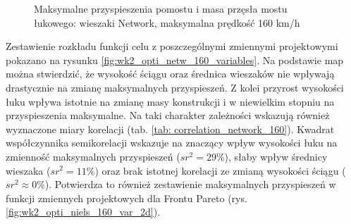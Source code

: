 \begin{figure}[hbt!]
	\centering
	\captionsetup{justification=centering}
	\caption{Maksymalne przyspieszenia pomostu i masa przęsła mostu łukowego: wieszaki Network, maksymalna prędkość 160 km/h}
	\label{fig:wk2_opti_netw_160_all}
\end{figure}

Zestawienie rozkładu funkcji celu z poszczególnymi zmiennymi projektowymi pokazano na rysunku \ref{fig:wk2_opti_netw_160_variables}. Na podstawie map można stwierdzić, że wysokość ściągu oraz średnica wieszaków nie wpływają drastycznie na zmianę maksymalnych przyspieszeń. Z kolei przyrost wysokości łuku wpływa istotnie na zmianę masy konstrukcji i w niewielkim stopniu na przyspieszenia maksymalne. Na taki charakter zależności wskazują również wyznaczone miary korelacji (tab. \ref{tab: correlation_network_160}). Kwadrat współczynnika semikorelacji wskazuje na znaczący wpływ wysokości łuku na zmienność maksymalnych przyspieszeń ($sr^2=29\%$), słaby wpływ średnicy wieszaka ($sr^2 = 11\%$) oraz brak istotnej korelacji ze zmianą wysokości ściągu ($sr^2\approx 0 \%$). Potwierdza to również zestawienie maksymalnych przyspieszeń w funkcji zmiennych projektowych dla Frontu Pareto (rys. \ref{fig:wk2_opti_niels_160_var_2d}).

